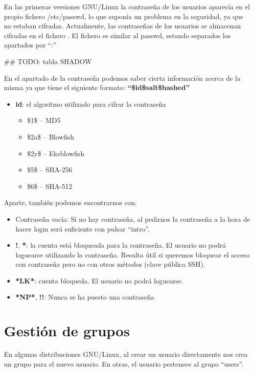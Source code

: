 \documentclass{../../../yukibook.cls/yukibook}
\begin{document}
En las primeras versiones GNU/Linux la contraseña de los usuarios aparecía en el propio fichero /etc/passwd, lo que suponía un problema en la seguridad, ya que no estaban cifradas. Actualmente, las contraseñas de los usuarios se almacenan cifradas en el fichero . El fichero es similar al passwd, estando separados los apartados por “:”

\#\# TODO: tabla SHADOW


En el apartado de la contraseña podemos saber cierta información acerca de la misma ya que tiene el siguiente formato: \textbf{“\$id\$salt\$hashed”}
\begin{itemize}
    \item \textbf{id}: el algoritmo utilizado para cifrar la contraseña
    \begin{itemize}
        \item \$1\$ – MD5
        \item \$2a\$ – Blowfish
        \item \$2y\$ – Eksblowfish
        \item \$5\$ – SHA-256
        \item \$6\$ – SHA-512
    \end{itemize}
\end{itemize}

Aparte, también podemos encontrarnos con:
\begin{itemize}
    \item Contraseña vacía:  Si no hay contraseña, al pedirnos la contraseña a la hora de hacer login será suficiente con pulsar “intro”.
    \item \textbf{!}, \textbf{*}: la cuenta está bloqueada para la contraseña. El usuario no podrá loguearse utilizando la contraseña. Resulta útil si queremos bloquear el acceso con contraseña pero no con otros métodos (clave pública SSH).
    \item \textbf{*LK*}: cuenta bloqueda. El usuario no podrá loguearse.
    \item \textbf{*NP*}, \textbf{!!}: Nunca se ha puesto una contraseña
\end{itemize}


\section{Gestión de grupos}
En algunas distribuciones GNU/Linux, al crear un usuario directamente nos crea un grupo para el nuevo usuario. En otras, el usuario pertenece al grupo “users”.
\end{document}
